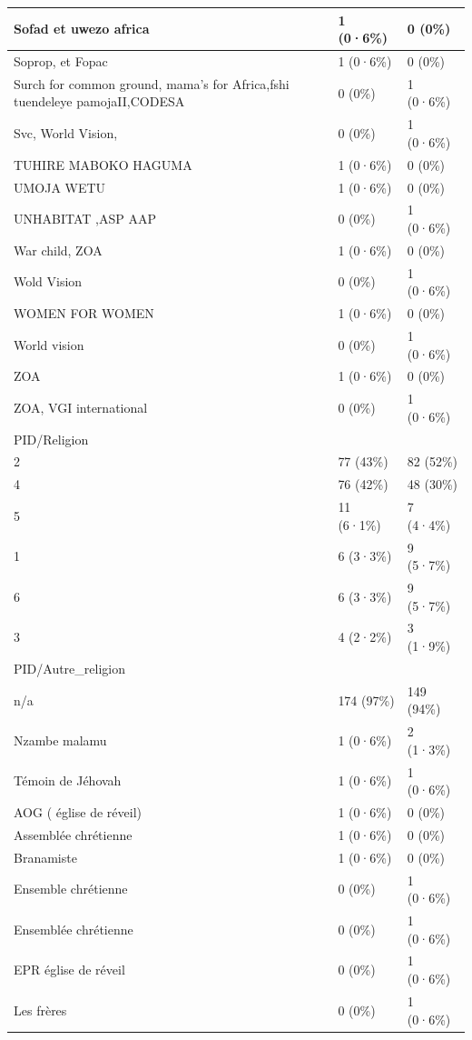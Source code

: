 \documentclass[
]{book}
\begin{document}
\begin{tabular}{l|l|l}
\hline
Sofad et uwezo africa & 1 (0·6\%) & 0 (0\%)\\
\hline
Soprop, et Fopac & 1 (0·6\%) & 0 (0\%)\\
\hline
Surch for common ground, mama's for Africa,fshi tuendeleye pamojaII,CODESA & 0 (0\%) & 1 (0·6\%)\\
\hline
Svc, World Vision, & 0 (0\%) & 1 (0·6\%)\\
\hline
TUHIRE MABOKO HAGUMA & 1 (0·6\%) & 0 (0\%)\\
\hline
UMOJA WETU & 1 (0·6\%) & 0 (0\%)\\
\hline
UNHABITAT ,ASP AAP & 0 (0\%) & 1 (0·6\%)\\
\hline
War child, ZOA & 1 (0·6\%) & 0 (0\%)\\
\hline
Wold Vision & 0 (0\%) & 1 (0·6\%)\\
\hline
WOMEN FOR WOMEN & 1 (0·6\%) & 0 (0\%)\\
\hline
World vision & 0 (0\%) & 1 (0·6\%)\\
\hline
ZOA & 1 (0·6\%) & 0 (0\%)\\
\hline
ZOA, VGI international & 0 (0\%) & 1 (0·6\%)\\
\hline
PID/Religion &  & \\
\hline
2 & 77 (43\%) & 82 (52\%)\\
\hline
4 & 76 (42\%) & 48 (30\%)\\
\hline
5 & 11 (6·1\%) & 7 (4·4\%)\\
\hline
1 & 6 (3·3\%) & 9 (5·7\%)\\
\hline
6 & 6 (3·3\%) & 9 (5·7\%)\\
\hline
3 & 4 (2·2\%) & 3 (1·9\%)\\
\hline
PID/Autre\_religion &  & \\
\hline
n/a & 174 (97\%) & 149 (94\%)\\
\hline
Nzambe malamu & 1 (0·6\%) & 2 (1·3\%)\\
\hline
Témoin de Jéhovah & 1 (0·6\%) & 1 (0·6\%)\\
\hline
AOG  ( église de réveil) & 1 (0·6\%) & 0 (0\%)\\
\hline
Assemblée chrétienne & 1 (0·6\%) & 0 (0\%)\\
\hline
Branamiste & 1 (0·6\%) & 0 (0\%)\\
\hline
Ensemble chrétienne & 0 (0\%) & 1 (0·6\%)\\
\hline
Ensemblée chrétienne & 0 (0\%) & 1 (0·6\%)\\
\hline
EPR église de réveil & 0 (0\%) & 1 (0·6\%)\\
\hline
Les frères & 0 (0\%) & 1 (0·6\%)\\

\end{tabular}
\end{document}
